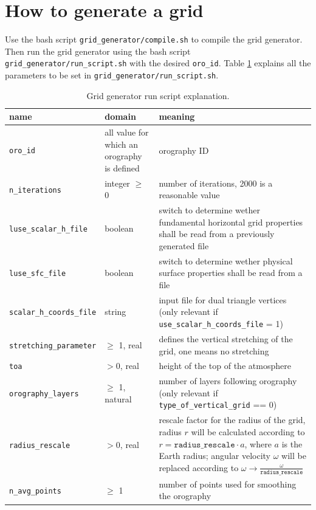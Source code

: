 \documentclass[10pt]{report}
\begin{document}
\section{How to generate a grid}
\label{sec:how_to_generate_a_grid}

Use the bash script \texttt{grid\_generator/compile.sh} to compile the grid generator. Then run the grid generator using the bash script \texttt{grid\_generator/run\_script.sh} with the desired \texttt{\texttt{oro\_id}}. Table \ref{tab:grid_generator_run_file_explanation} explains all the parameters to be set in \texttt{grid\_generator/run\_script.sh}.

\renewcommand{\arraystretch}{1.2}
\begin{table}
\centering
\begin{tabular}{|>{\centering}p{5.0 cm}|>{\centering}p{3 cm}|>{\centering}p{7 cm}|}
\hline \textbf{name} & \textbf{domain} & \textbf{meaning} \tabularnewline
\hline\hline \texttt{\texttt{oro\_id}} & all value for which an orography is defined & orography ID \tabularnewline
\hline\hline \texttt{n\_iterations} & integer $\geq$ 0 & number of iterations, 2000 is a reasonable value \tabularnewline
\hline\hline \texttt{luse\_scalar\_h\_file} & boolean & switch to determine wether fundamental horizontal grid properties shall be read from a previously generated file \tabularnewline
\hline\hline \texttt{luse\_sfc\_file} & boolean & switch to determine wether physical surface properties shall be read from a file \tabularnewline
\hline\hline \texttt{scalar\_h\_coords\_file} & string & input file for dual triangle vertices (only relevant if \texttt{use\_scalar\_h\_coords\_file} = 1) \tabularnewline
\hline\hline \texttt{stretching\_parameter} & $\geq$ 1, real & defines the vertical stretching of the grid, one means no stretching \tabularnewline
\hline\hline \texttt{toa} & $> 0$, real & height of the top of the atmosphere \tabularnewline
\hline\hline \texttt{orography\_layers} & $\geq$ 1, natural & number of layers following orography (only relevant if \texttt{type\_of\_vertical\_grid} == 0) \tabularnewline
\hline\hline \texttt{radius\_rescale} & $> 0$, real & rescale factor for the radius of the grid, radius $r$ will be calculated according to $r = \texttt{radius\_rescale}\cdot a$, where $a$ is the Earth radius; angular velocity $\omega$ will be replaced according to $\omega \to \frac{\omega}{\texttt{radius\_rescale}}$ \tabularnewline
\hline\hline \texttt{n\_avg\_points} & $\geq$ 1 & number of points used for smoothing the orography \tabularnewline
\hline
\end{tabular}
\caption{Grid generator run script explanation.}
\label{tab:grid_generator_run_file_explanation}
\end{table}
\renewcommand{\arraystretch}{1}
\end{document}
